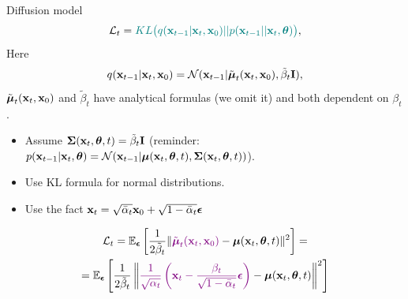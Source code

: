 \begin{frame}{Diffusion model}
	\[
		\mathcal{L}_t = {\color{teal}KL \bigl(q(\mathbf{x}_{t-1} | \mathbf{x}_t, \mathbf{x}_0) || p(\mathbf{x}_{t - 1} || \mathbf{x}_t, \boldsymbol{\theta} )\bigr)},
	\]
	Here
	\[
		q(\mathbf{x}_{t-1} | \mathbf{x}_t, \mathbf{x}_0) = \mathcal{N}(\mathbf{x}_{t-1} | \tilde{\boldsymbol{\mu}}_t(\mathbf{x}_t, \mathbf{x}_0), \tilde{\beta}_t \mathbf{I}),
	\]
	$\tilde{\boldsymbol{\mu}}_t(\mathbf{x}_t, \mathbf{x}_0)$ and $\tilde{\beta}_t$ have analytical formulas (we omit it) and both dependent on $\beta_t$.
	\begin{itemize}
		\item Assume $\boldsymbol{\Sigma}(\mathbf{x}_t, \boldsymbol{\theta}, t) = \tilde{\beta}_t \mathbf{I}$ {\color{gray}(reminder: $p(\mathbf{x}_{t - 1} | \mathbf{x}_t, \boldsymbol{\theta}) = \mathcal{N}(\mathbf{x}_{t - 1} | \boldsymbol{\mu}(\mathbf{x}_t, \boldsymbol{\theta}, t), \boldsymbol{\Sigma}(\mathbf{x}_t, \boldsymbol{\theta}, t))$)}.
		\item Use KL formula for normal distributions.
		\item Use the fact $\mathbf{x}_t = \sqrt{\bar{\alpha}_t} \mathbf{x}_{0} + \sqrt{1 - \bar{\alpha}_t} \boldsymbol{\epsilon}$
	\end{itemize}
	\begin{multline*}
		\mathcal{L}_t = \mathbb{E}_{\boldsymbol{\epsilon}} \left[ \frac{1}{2\tilde{\beta}_t} \| {\color{violet} \tilde{\boldsymbol{\mu}}_t(\mathbf{x}_t, \mathbf{x}_0)} - \boldsymbol{\mu}(\mathbf{x}_t, \boldsymbol{\theta}, t) \|^2 \right] = \\ 
		= \mathbb{E}_{\boldsymbol{\epsilon}} \left[ \frac{1}{2\tilde{\beta}_t} \left\| {\color{violet} \frac{1}{\sqrt{\alpha_t}}\left( \mathbf{x}_t - \frac{\beta_t}{\sqrt{1 - \bar{\alpha}_t} } \boldsymbol{\epsilon} \right)} - \boldsymbol{\mu}(\mathbf{x}_t, \boldsymbol{\theta}, t) \right\|^2 \right]
	\end{multline*}
	\end{frame}

